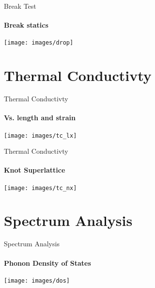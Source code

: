 \documentclass{beamer}
\begin{document}
\begin{frame}{Break Test}
  \framesubtitle{Break statics}%
  \texttt{[image: images/drop]}

\end{frame}

\section{Thermal Conductivty}
\begin{frame}{Thermal Conductivty}
  \framesubtitle{Vs. length and strain}%
  \texttt{[image: images/tc\_lx]}

\end{frame}
\begin{frame}{Thermal Conductivty}
  \framesubtitle{Knot Superlattice}%
  \texttt{[image: images/tc\_nx]}

\end{frame}

\section{Spectrum Analysis}
\begin{frame}{Spectrum Analysis}
  \framesubtitle{Phonon Density of States}%
  \texttt{[image: images/dos]}

\end{frame}
\end{document}
